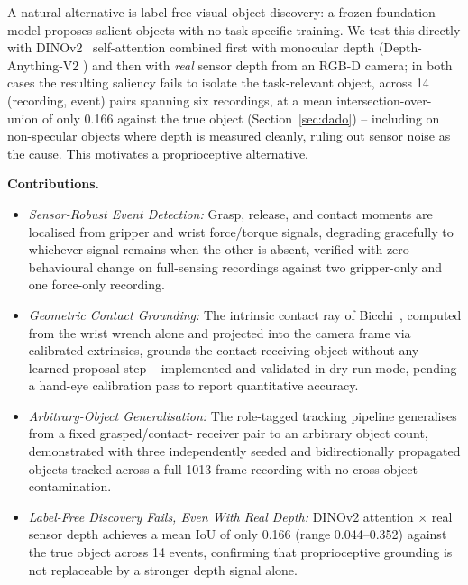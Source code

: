 \documentclass[letterpaper, 10pt, journal, twoside]{IEEEtran}
\begin{document}
A natural alternative is label-free visual object discovery: a frozen
foundation model proposes salient objects with no task-specific training.
We test this directly with DINOv2~\cite{oquab2023dinov2} self-attention
combined first with monocular depth (Depth-Anything-V2
\cite{yang2024depthanythingv2}) and then with \emph{real} sensor depth
from an RGB-D camera; in both cases the resulting saliency fails to
isolate the task-relevant object, across 14 (recording, event) pairs
spanning six recordings, at a mean intersection-over-union of only 0.166
against the true object (Section~\ref{sec:dado}) -- including on
non-specular objects where depth is measured cleanly, ruling out sensor
noise as the cause. This motivates a proprioceptive alternative.

\textbf{Contributions.}
\begin{itemize}
  \item \textit{Sensor-Robust Event Detection:} Grasp, release, and
        contact moments are localised from gripper and wrist
        force/torque signals, degrading gracefully to whichever signal
        remains when the other is absent, verified with zero
        behavioural change on full-sensing recordings against two
        gripper-only and one force-only recording.
  \item \textit{Geometric Contact Grounding:} The intrinsic contact ray
        of Bicchi~\cite{bicchi1990}, computed from the wrist wrench alone
        and projected into the camera frame via calibrated extrinsics,
        grounds the contact-receiving object without any learned
        proposal step -- implemented and validated in dry-run mode,
        pending a hand-eye calibration pass to report quantitative
        accuracy.
  \item \textit{Arbitrary-Object Generalisation:} The role-tagged
        tracking pipeline generalises from a fixed grasped/contact-
        receiver pair to an arbitrary object count, demonstrated with
        three independently seeded and bidirectionally propagated
        objects tracked across a full 1013-frame recording with no
        cross-object contamination.
  \item \textit{Label-Free Discovery Fails, Even With Real Depth:}
        DINOv2 attention $\times$ real sensor depth achieves a mean IoU
        of only 0.166 (range 0.044--0.352) against the true object across
        14 events, confirming that proprioceptive grounding is not
        replaceable by a stronger depth signal alone.
\end{itemize}
\end{document}
